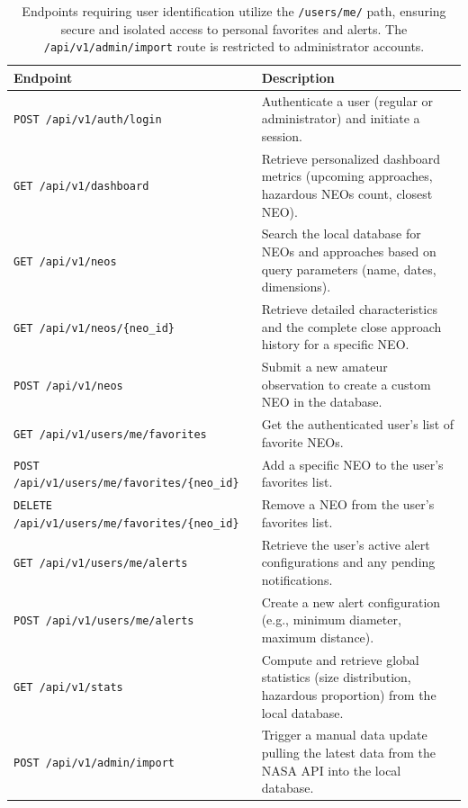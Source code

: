 \begin{table}[htbp]
    \centering
    \begin{tabular}{|l|p{9cm}|}
        \hline
        \textbf{Endpoint} & \textbf{Description} \\
        \hline
        \texttt{POST /api/v1/auth/login} & Authenticate a user (regular or administrator) and initiate a session. \\
        \hline
        \texttt{GET /api/v1/dashboard} & Retrieve personalized dashboard metrics (upcoming approaches, hazardous NEOs count, closest NEO). \\
        \hline
        \texttt{GET /api/v1/neos} & Search the local database for NEOs and approaches based on query parameters (name, dates, dimensions). \\
        \hline
        \texttt{GET /api/v1/neos/\{neo\_id\}} & Retrieve detailed characteristics and the complete close approach history for a specific NEO. \\
        \hline
        \texttt{POST /api/v1/neos} & Submit a new amateur observation to create a custom NEO in the database. \\
        \hline
        \texttt{GET /api/v1/users/me/favorites} & Get the authenticated user's list of favorite NEOs. \\
        \hline
        \texttt{POST /api/v1/users/me/favorites/\{neo\_id\}} & Add a specific NEO to the user's favorites list. \\
        \hline
        \texttt{DELETE /api/v1/users/me/favorites/\{neo\_id\}} & Remove a NEO from the user's favorites list. \\
        \hline
        \texttt{GET /api/v1/users/me/alerts} & Retrieve the user's active alert configurations and any pending notifications. \\
        \hline
        \texttt{POST /api/v1/users/me/alerts} & Create a new alert configuration (e.g., minimum diameter, maximum distance). \\
        \hline
        \texttt{GET /api/v1/stats} & Compute and retrieve global statistics (size distribution, hazardous proportion) from the local database. \\
        \hline
        \texttt{POST /api/v1/admin/import} & Trigger a manual data update pulling the latest data from the NASA API into the local database. \\
        \hline
    \end{tabular}
    \caption{Endpoints requiring user identification utilize the \texttt{/users/me/} path, ensuring secure and isolated access to personal favorites and alerts. The \texttt{/api/v1/admin/import} route is restricted to administrator accounts. }
    \label{tab:endpoints}
\end{table}


